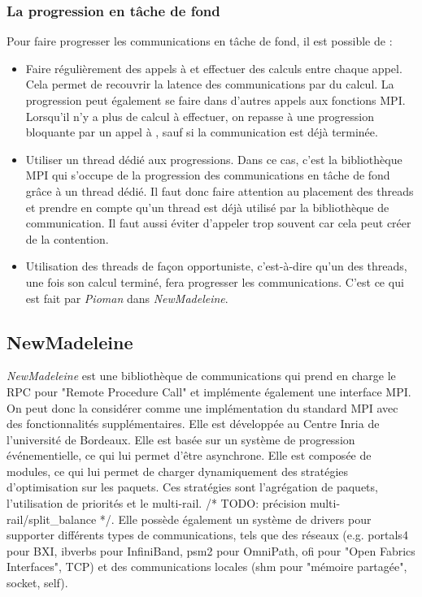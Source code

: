 \subsubsection{La progression en tâche de fond}

Pour faire progresser les communications en tâche de fond, il est possible de :

\begin{itemize}
  \item Faire régulièrement des appels à  et effectuer des calculs entre chaque appel.
  Cela permet de recouvrir la latence des communications par du calcul.
  La progression peut également se faire dans d'autres appels aux fonctions MPI.
  Lorsqu'il n'y a plus de calcul à effectuer, on repasse à une progression bloquante par un appel à , sauf si la communication est déjà terminée.
  \item Utiliser un thread dédié aux progressions.
  Dans ce cas, c'est la bibliothèque MPI qui s'occupe de la progression des communications en tâche de fond grâce à un thread dédié.
  Il faut donc faire attention au placement des threads et prendre en compte qu'un thread est déjà utilisé par la bibliothèque de communication.
  Il faut aussi éviter d'appeler trop souvent  car cela peut créer de la contention.
  \item Utilisation des threads de façon opportuniste, c'est-à-dire qu'un des threads, une fois son calcul terminé, fera progresser les communications.
  C'est ce qui est fait par \emph{Pioman} dans \emph{NewMadeleine}.
\end{itemize}

\subsection{NewMadeleine}

\emph{NewMadeleine} est une bibliothèque de communications qui prend en charge le RPC pour "Remote Procedure Call" et implémente également une interface MPI.
On peut donc la considérer comme une implémentation du standard MPI avec des fonctionnalités supplémentaires.
Elle est développée au Centre Inria de l'université de Bordeaux.
Elle est basée sur un système de progression événementielle, ce qui lui permet d'être asynchrone.
Elle est composée de modules, ce qui lui permet de charger dynamiquement des stratégies d'optimisation sur les paquets.
Ces stratégies sont l'agrégation de paquets, l'utilisation de priorités et le multi-rail. /* TODO: précision multi-rail/split_balance */.
Elle possède également un système de drivers pour supporter différents types de communications, tels que des réseaux
(e.g. portals4 pour BXI, ibverbs pour InfiniBand, psm2 pour OmniPath, ofi pour "Open Fabrics Interfaces", TCP) %
et des communications locales (shm pour "mémoire partagée", socket, self).

